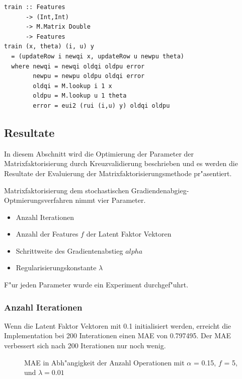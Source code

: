 \documentclass[a4paper, 12pt]{article}
\begin{document}
\begin{lstlisting}[caption=Implementation Funk SGD, label=lst:sgd] 
train :: Features
      -> (Int,Int) 
      -> M.Matrix Double 
      -> Features
train (x, theta) (i, u) y
  = (updateRow i newqi x, updateRow u newpu theta)
  where newqi = newqi oldqi oldpu error
        newpu = newpu oldpu oldqi error
        oldqi = M.lookup i 1 x
        oldpu = M.lookup u 1 theta
        error = eui2 (rui (i,u) y) oldqi oldpu  
\end{lstlisting}

\subsection{Resultate}
\label{sec:matrixfactorresults}
In diesem Abschnitt wird die Optimierung der Parameter der Matrixfaktorisierung durch Kreuzvalidierung beschrieben und es werden die Resultate der Evaluierung der Matrixfaktorisierungsmethode pr"asentiert. 

Matrixfaktorisierung dem stochastischen Gradiendenabgieg-Optmierungsverfahren  nimmt vier Parameter.
\begin{itemize}
\item Anzahl Iterationen
\item Anzahl der Features $f$ der Latent Faktor Vektoren
\item Schrittweite des Gradientenabstieg $alpha$
\item Regularisierungskonstante $\lambda$
\end{itemize}

F"ur jeden Parameter wurde ein Experiment durchgef"uhrt.

\subsubsection{Anzahl Iterationen}

Wenn die Latent Faktor Vektoren mit 0.1 initialisiert werden, erreicht die Implementation bei 200 Interationen einen MAE von 0.797495. Der MAE verbessert sich nach 200 Iterationen nur noch wenig.

\begin{figure}
  \centering
{}
\caption{MAE in Abh"angigkeit der Anzahl Operationen mit $\alpha$ = 0.15, $f$ = 5, und $\lambda=0.01$}
\end{figure}
\end{document}
